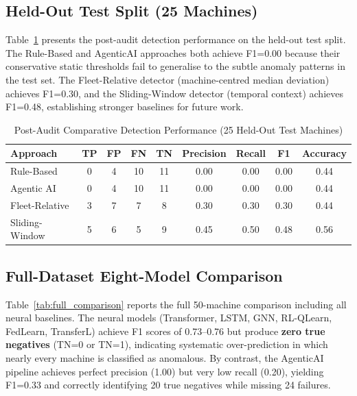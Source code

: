 \subsection{Held-Out Test Split (25 Machines)}

Table~\ref{tab:post_audit_test} presents the post-audit detection performance on the held-out test split. The Rule-Based and AgenticAI approaches both achieve F1=0.00 because their conservative static thresholds fail to generalise to the subtle anomaly patterns in the test set. The Fleet-Relative detector (machine-centred median deviation) achieves F1=0.30, and the Sliding-Window detector (temporal context) achieves F1=0.48, establishing stronger baselines for future work.

\begin{table}[htbp]
\centering
\caption{Post-Audit Comparative Detection Performance (25 Held-Out Test Machines)}
\label{tab:post_audit_test}
\begin{tabular}{lcccccccc}
\hline
\textbf{Approach} & \textbf{TP} & \textbf{FP} & \textbf{FN} & \textbf{TN} & \textbf{Precision} & \textbf{Recall} & \textbf{F1} & \textbf{Accuracy} \\
\hline
Rule-Based   & 0 & 4  & 10 & 11 & 0.00 & 0.00 & 0.00 & 0.44 \\
Agentic AI   & 0 & 4  & 10 & 11 & 0.00 & 0.00 & 0.00 & 0.44 \\
Fleet-Relative & 3 & 7  & 7  & 8  & 0.30 & 0.30 & 0.30 & 0.44 \\
Sliding-Window & 5 & 6  & 5  & 9  & 0.45 & 0.50 & 0.48 & 0.56 \\
\hline
\end{tabular}
\end{table}

\subsection{Full-Dataset Eight-Model Comparison}

Table~\ref{tab:full_comparison} reports the full 50-machine comparison including all neural baselines. The neural models (Transformer, LSTM, GNN, RL-QLearn, FedLearn, TransferL) achieve F1 scores of 0.73--0.76 but produce \textbf{zero true negatives} (TN=0 or TN=1), indicating systematic over-prediction in which nearly every machine is classified as anomalous. By contrast, the AgenticAI pipeline achieves perfect precision (1.00) but very low recall (0.20), yielding F1=0.33 and correctly identifying 20 true negatives while missing 24 failures.

